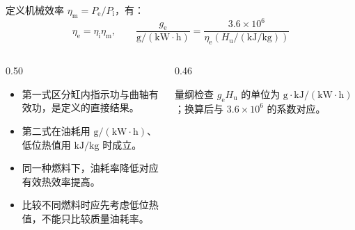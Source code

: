 \begin{frame}[t,shrink]{}
定义机械效率 \(\eta_{\mathrm{m}}=P_{\mathrm{e}}/P_{\mathrm{i}}\)，有：
$$
\eta_{\mathrm{e}}=\eta_{\mathrm{i}}\eta_{\mathrm{m}},
\qquad
\frac{g_{\mathrm{e}}}{\mathrm{g/(kW\cdot h)}}
=\frac{3.6\times10^6}
{\eta_{\mathrm{e}}\left(H_{\mathrm{u}}/\mathrm{(kJ/kg)}\right)}
$$
\begin{columns}[T,onlytextwidth]
\begin{column}{0.50\textwidth}
  \begin{itemize}
    \item 第一式区分缸内指示功与曲轴有效功，是定义的直接结果。
    \item 第二式在油耗用 \(\mathrm{g/(kW\cdot h)}\)、低位热值用 \(\mathrm{kJ/kg}\) 时成立。
    \item 同一种燃料下，油耗率降低对应有效热效率提高。
    \item 比较不同燃料时应先考虑低位热值，不能只比较质量油耗率。
  \end{itemize}
\end{column}
\begin{column}{0.46\textwidth}
  \begin{keybox}{量纲检查}
  \small \(g_{\mathrm{e}}H_{\mathrm{u}}\) 的单位为 \(\mathrm{g\cdot kJ/(kW\cdot h)}\)；换算后与 \(3.6\times10^6\) 的系数对应。
  \end{keybox}
\end{column}
\end{columns}
\end{frame}

